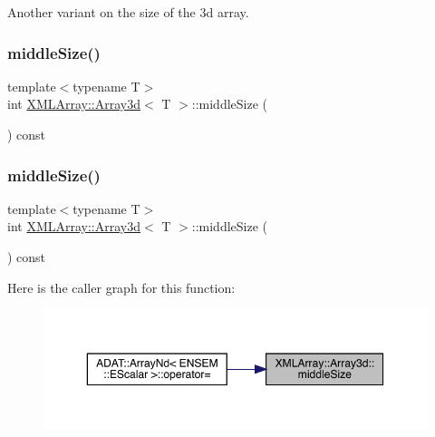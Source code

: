 Another variant on the size of the 3d array. 

\mbox{\label{classXMLArray_1_1Array3d_aa28ef386c7869c03b34f5a24a55bfde2}} 
\subsubsection{\texorpdfstring{middleSize()}{middleSize()}\hspace{0.1cm}{\footnotesize\ttfamily [1/3]}}
{\footnotesize\ttfamily template$<$typename T$>$ \\
int \mbox{\hyperlink{classXMLArray_1_1Array3d}{X\+M\+L\+Array\+::\+Array3d}}$<$ T $>$\+::middle\+Size (\begin{DoxyParamCaption}{ }\end{DoxyParamCaption}) const\hspace{0.3cm}{\ttfamily [inline]}}

\mbox{\label{classXMLArray_1_1Array3d_aa28ef386c7869c03b34f5a24a55bfde2}} 
\subsubsection{\texorpdfstring{middleSize()}{middleSize()}\hspace{0.1cm}{\footnotesize\ttfamily [2/3]}}
{\footnotesize\ttfamily template$<$typename T$>$ \\
int \mbox{\hyperlink{classXMLArray_1_1Array3d}{X\+M\+L\+Array\+::\+Array3d}}$<$ T $>$\+::middle\+Size (\begin{DoxyParamCaption}{ }\end{DoxyParamCaption}) const\hspace{0.3cm}{\ttfamily [inline]}}

Here is the caller graph for this function\+:
\nopagebreak
\begin{figure}[H]
\begin{center}
\leavevmode
\includegraphics[width=350pt]{db/da0/classXMLArray_1_1Array3d_aa28ef386c7869c03b34f5a24a55bfde2_icgraph}
\end{center}
\end{figure}
\mbox{\label{classXMLArray_1_1Array3d_aa28ef386c7869c03b34f5a24a55bfde2}} 

